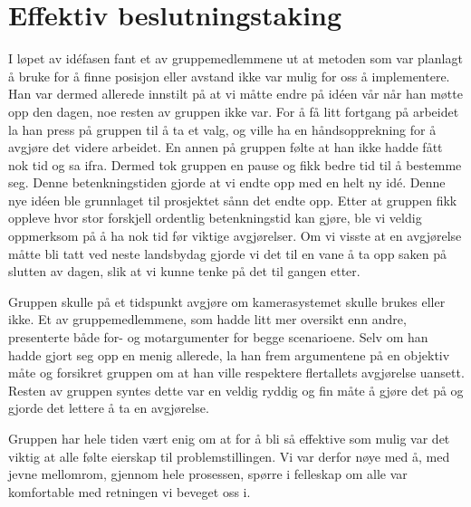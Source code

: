 \section{Effektiv beslutningstaking}
I løpet av idéfasen fant et av gruppemedlemmene ut at metoden som var planlagt å bruke for å finne posisjon eller avstand ikke var mulig for oss å implementere. Han var dermed allerede innstilt på at vi måtte endre på idéen vår når han møtte opp den dagen, noe resten av gruppen ikke var. For å få litt fortgang på arbeidet la han press på gruppen til å ta et valg, og ville ha en håndsopprekning for å avgjøre det videre arbeidet. En annen på gruppen følte at han ikke hadde fått nok tid og sa ifra. Dermed tok gruppen en pause og fikk bedre tid til å bestemme seg. Denne betenkningstiden gjorde at vi endte opp med en helt ny idé. Denne nye idéen ble grunnlaget til prosjektet sånn det endte opp. Etter at gruppen fikk oppleve hvor stor forskjell ordentlig betenkningstid kan gjøre, ble vi veldig oppmerksom på å ha nok tid før viktige avgjørelser. Om vi visste at en avgjørelse måtte bli tatt ved neste landsbydag gjorde vi det til en vane å ta opp saken på slutten av dagen, slik at vi kunne tenke på det til gangen etter.
    
Gruppen skulle på et tidspunkt avgjøre om kamerasystemet skulle brukes eller ikke. Et av gruppemedlemmene, som hadde litt mer oversikt enn andre, presenterte både for- og motargumenter for begge scenarioene. Selv om han hadde gjort seg opp en menig allerede, la han frem argumentene på en objektiv måte og forsikret gruppen om at han ville respektere flertallets avgjørelse uansett. Resten av gruppen syntes dette var en veldig ryddig og fin måte å gjøre det på og gjorde det lettere å ta en avgjørelse.

Gruppen har hele tiden vært enig om at for å bli så effektive som mulig var det viktig at alle følte eierskap til problemstillingen. Vi var derfor nøye med å, med jevne mellomrom, gjennom hele prosessen, spørre i felleskap om alle var komfortable med retningen vi beveget oss i. 